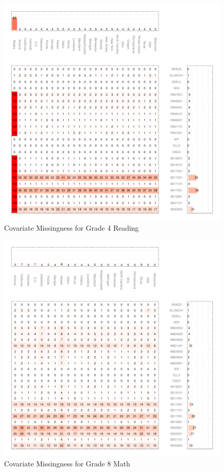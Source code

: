 \documentclass[letterpaper,12p,twoside]{article} %
\begin{document}
\begin{figure}[h]
\begin{center}
\includegraphics[width=\textwidth]{../Figures2009/g4read-missing.pdf}
\caption{Covariate Missingness for Grade 4 Reading}
\label{fig:g4reading:missing}
\end{center}
\end{figure}

\begin{figure}[h]
\begin{center}
\includegraphics[width=\textwidth]{../Figures2009/g8math-missing.pdf}
\caption{Covariate Missingness for Grade 8 Math}
\label{fig:g8math:missing}
\end{center}
\end{figure}
\end{document}
